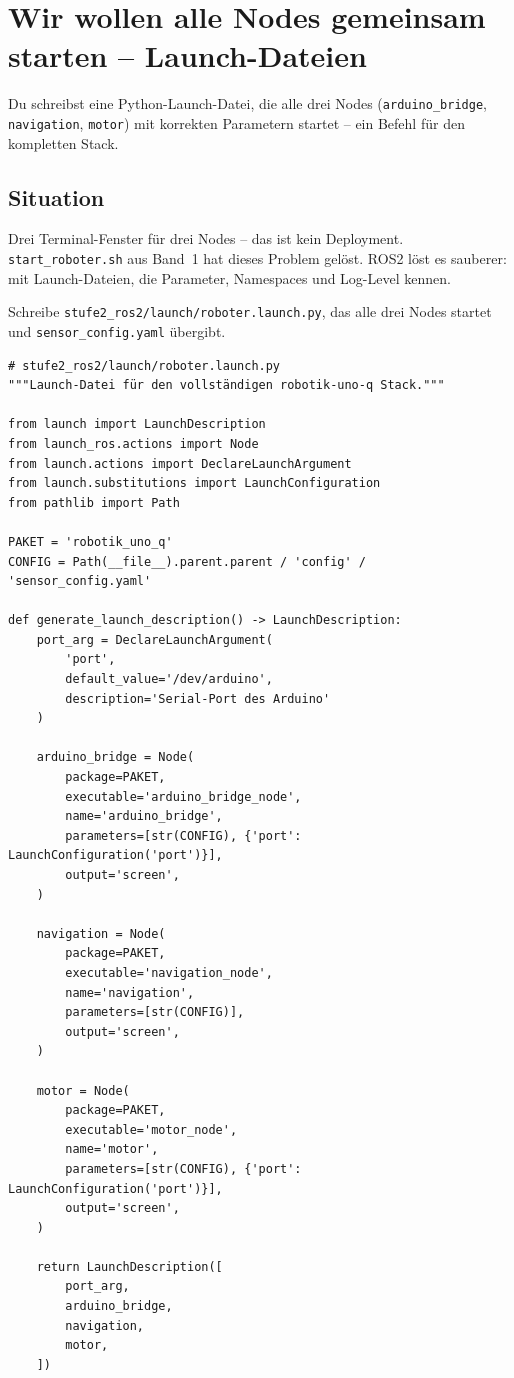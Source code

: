 \chapter{Wir wollen alle Nodes gemeinsam starten – Launch-Dateien}

\begin{lernziele}
Du schreibst eine Python-Launch-Datei, die alle drei Nodes
(\texttt{arduino\_bridge}, \texttt{navigation}, \texttt{motor}) mit
korrekten Parametern startet -- ein Befehl für den kompletten Stack.
\end{lernziele}

\section{Situation}

Drei Terminal-Fenster für drei Nodes -- das ist kein Deployment.
\texttt{start\_roboter.sh} aus Band~1 hat dieses Problem gelöst.
ROS2 löst es sauberer: mit Launch-Dateien,
die Parameter, Namespaces und Log-Level kennen.

\begin{aufgabeBox}
Schreibe \texttt{stufe2\_ros2/launch/roboter.launch.py},
das alle drei Nodes startet und \texttt{sensor\_config.yaml} übergibt.
\end{aufgabeBox}

\begin{lstlisting}
# stufe2_ros2/launch/roboter.launch.py
"""Launch-Datei für den vollständigen robotik-uno-q Stack."""

from launch import LaunchDescription
from launch_ros.actions import Node
from launch.actions import DeclareLaunchArgument
from launch.substitutions import LaunchConfiguration
from pathlib import Path

PAKET = 'robotik_uno_q'
CONFIG = Path(__file__).parent.parent / 'config' / 'sensor_config.yaml'

def generate_launch_description() -> LaunchDescription:
    port_arg = DeclareLaunchArgument(
        'port',
        default_value='/dev/arduino',
        description='Serial-Port des Arduino'
    )

    arduino_bridge = Node(
        package=PAKET,
        executable='arduino_bridge_node',
        name='arduino_bridge',
        parameters=[str(CONFIG), {'port': LaunchConfiguration('port')}],
        output='screen',
    )

    navigation = Node(
        package=PAKET,
        executable='navigation_node',
        name='navigation',
        parameters=[str(CONFIG)],
        output='screen',
    )

    motor = Node(
        package=PAKET,
        executable='motor_node',
        name='motor',
        parameters=[str(CONFIG), {'port': LaunchConfiguration('port')}],
        output='screen',
    )

    return LaunchDescription([
        port_arg,
        arduino_bridge,
        navigation,
        motor,
    ])
\end{lstlisting}

